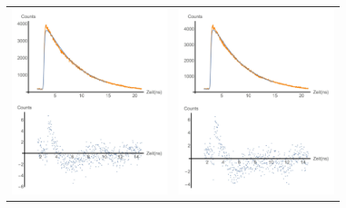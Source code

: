 \documentclass{article}
\begin{document}
\begin{figure}
\begin{tabular}{cc}
  \includegraphics[width=\textwidth/2]{Bilder/FitOD03.jpg}  &   \includegraphics[width=\textwidth/2]{Bilder/FitOD07.jpg}\\

\end{tabular}
\end{figure}
\end{document}
